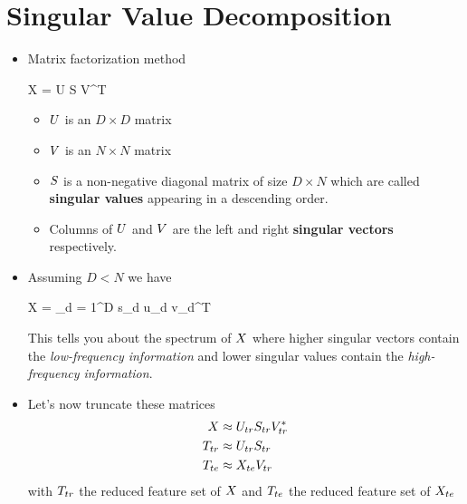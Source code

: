 \section{Singular Value Decomposition}
\begin{itemize}
	\item Matrix factorization method
	\begin{myalign*}
	    \*X = \*U \*S \*V^T
	\end{myalign*}
	\begin{itemize}
		\item $\*U$ is an $D \times D$ matrix
		\item $\*V$ is an $N \times N$ matrix
		\item $\*S$ is a non-negative diagonal matrix of size $D \times N$ which are called \textbf{singular values} appearing in a descending order.
		\item Columns of $\*U$ and $\*V$ are the left and right \textbf{singular vectors} respectively.
	\end{itemize}
	\item Assuming $D < N$ we have
	\begin{myalign*}
	    \*X = \sum_{d = 1}^D s_d \*u_d \*v_d^T
	\end{myalign*}
	This tells you about the spectrum of $\*X$ where higher singular vectors contain the \textit{low-frequency information} and lower singular values contain the \textit{high-frequency information}.
    \item Let's now truncate these matrices
    \begin{align*}
        \*X &\approx \*U_{tr} \*S_{tr} \*V^*_{tr} \\
        \*T_{tr} &\approx \*U_{tr} \*S_{tr} \\
        \*T_{te} &\approx \*X_{te}\*V_{tr}
    \end{align*}
    with $\*T_{tr}$ the reduced feature set of $\*X$ and $\*T_{te}$ the reduced feature set of $\*X_{te}$
\end{itemize}

